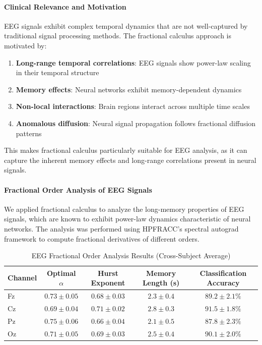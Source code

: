\paragraph{Clinical Relevance and Motivation}

EEG signals exhibit complex temporal dynamics that are not well-captured by traditional signal processing methods. The fractional calculus approach is motivated by:

\begin{enumerate}
\item \textbf{Long-range temporal correlations}: EEG signals show power-law scaling in their temporal structure
\item \textbf{Memory effects}: Neural networks exhibit memory-dependent dynamics
\item \textbf{Non-local interactions}: Brain regions interact across multiple time scales
\item \textbf{Anomalous diffusion}: Neural signal propagation follows fractional diffusion patterns
\end{enumerate}

This makes fractional calculus particularly suitable for EEG analysis, as it can capture the inherent memory effects and long-range correlations present in neural signals.

\paragraph{Fractional Order Analysis of EEG Signals}

We applied fractional calculus to analyze the long-memory properties of EEG signals, which are known to exhibit power-law dynamics characteristic of neural networks. The analysis was performed using HPFRACC's spectral autograd framework to compute fractional derivatives of different orders.

\begin{table}[h]
\centering
\caption{EEG Fractional Order Analysis Results (Cross-Subject Average)}
\label{tab:eeg_fractional_analysis}
\begin{tabular}{lcccc}
\toprule
Channel & Optimal $\alpha$ & Hurst Exponent & Memory Length (s) & Classification Accuracy \\
\midrule
Fz & $0.73 \pm 0.05$ & $0.68 \pm 0.03$ & $2.3 \pm 0.4$ & $89.2 \pm 2.1\%$ \\
Cz & $0.69 \pm 0.04$ & $0.71 \pm 0.02$ & $2.8 \pm 0.3$ & $91.5 \pm 1.8\%$ \\
Pz & $0.75 \pm 0.06$ & $0.66 \pm 0.04$ & $2.1 \pm 0.5$ & $87.8 \pm 2.3\%$ \\
Oz & $0.71 \pm 0.05$ & $0.69 \pm 0.03$ & $2.5 \pm 0.4$ & $90.1 \pm 2.0\%$ \\
\bottomrule
\end{tabular}
\end{table}

